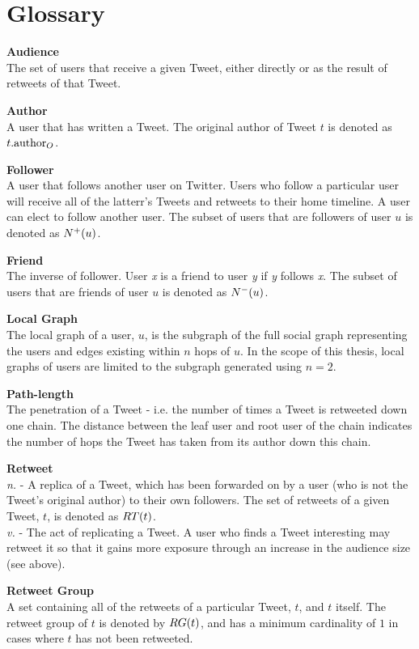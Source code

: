 \chapter*{Glossary} 

{\bf Audience}\\
The set of users that receive a given Tweet, either directly or as the result of retweets of that Tweet.

{\bf Author}\\
A user that has written a Tweet. The original author of Tweet $t$ is denoted as $t.\textrm{author}_O$. 

{\bf Follower}\\
A user that follows another user on Twitter. Users who follow a particular user will receive all of the latterr's Tweets and retweets to their home timeline. A user can elect to follow another user. The subset of users that are followers of user $u$ is denoted as $N^+(u)$.

{\bf Friend}\\
The inverse of follower. User \textit{x} is a friend to user \textit{y} if \textit{y} follows \textit{x}. The subset of users that are friends of user $u$ is denoted as $N^-(u)$.

{\bf Local Graph}\\
The local graph of a user, $u$, is the subgraph of the full social graph representing the users and edges existing within $n$ hops of $u$. In the scope of this thesis, local graphs of users are limited to the subgraph generated using $n=2$.

{\bf Path-length}\\
The penetration of a Tweet - i.e. the number of times a Tweet is retweeted down one chain. The distance between the leaf user and root user of the chain indicates the number of hops the Tweet has taken from its author down this chain.
			
{\bf Retweet}\\
\textit{n.} - A replica of a Tweet, which has been forwarded on by a user (who is not the Tweet's original author) to their own followers. The set of retweets of a given Tweet, $t$, is denoted as $RT(t)$.\\
\textit{v.} - The act of replicating a Tweet. A user who finds a Tweet interesting may retweet it so that it gains more exposure through an increase in the audience size (see above).
									
{\bf Retweet Group}\\
A set containing all of the retweets of a particular Tweet, $t$, and $t$ itself. The retweet group of $t$ is denoted by $RG(t)$, and has a minimum cardinality of $1$ in cases where $t$ has not been retweeted.

